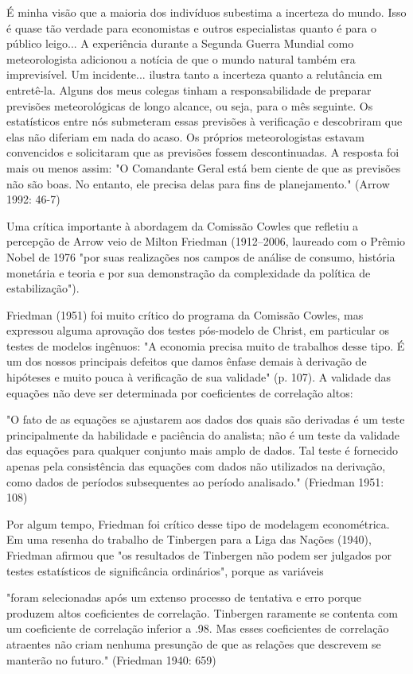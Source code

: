 \documentclass[12pt]{article}
\begin{document}
É minha visão que a maioria dos indivíduos subestima a incerteza do mundo. Isso é quase tão verdade para economistas e outros especialistas quanto é para o público leigo... A experiência durante a Segunda Guerra Mundial como meteorologista adicionou a notícia de que o mundo natural também era imprevisível. Um incidente... ilustra tanto a incerteza quanto a relutância em entretê-la. Alguns dos meus colegas tinham a responsabilidade de preparar previsões meteorológicas de longo alcance, ou seja, para o mês seguinte. Os estatísticos entre nós submeteram essas previsões à verificação e descobriram que elas não diferiam em nada do acaso. Os próprios meteorologistas estavam convencidos e solicitaram que as previsões fossem descontinuadas. A resposta foi mais ou menos assim: "O Comandante Geral está bem ciente de que as previsões não são boas. No entanto, ele precisa delas para fins de planejamento."
(Arrow 1992: 46-7)

Uma crítica importante à abordagem da Comissão Cowles que refletiu a percepção de Arrow veio de Milton Friedman (1912–2006, laureado com o Prêmio Nobel de 1976 "por suas realizações nos campos de análise de consumo, história monetária e teoria e por sua demonstração da complexidade da política de estabilização").

Friedman (1951) foi muito crítico do programa da Comissão Cowles, mas expressou alguma aprovação dos testes pós-modelo de Christ, em particular os testes de modelos ingênuos: "A economia precisa muito de trabalhos desse tipo. É um dos nossos principais defeitos que damos ênfase demais à derivação de hipóteses e muito pouca à verificação de sua validade" (p. 107). A validade das equações não deve ser determinada por coeficientes de correlação altos:

"O fato de as equações se ajustarem aos dados dos quais são derivadas é um teste principalmente da habilidade e paciência do analista; não é um teste da validade das equações para qualquer conjunto mais amplo de dados. Tal teste é fornecido apenas pela consistência das equações com dados não utilizados na derivação, como dados de períodos subsequentes ao período analisado."
(Friedman 1951: 108)

Por algum tempo, Friedman foi crítico desse tipo de modelagem econométrica. Em uma resenha do trabalho de Tinbergen para a Liga das Nações (1940), Friedman afirmou que "os resultados de Tinbergen não podem ser julgados por testes estatísticos de significância ordinários", porque as variáveis

"foram selecionadas após um extenso processo de tentativa e erro porque produzem altos coeficientes de correlação. Tinbergen raramente se contenta com um coeficiente de correlação inferior a .98. Mas esses coeficientes de correlação atraentes não criam nenhuma presunção de que as relações que descrevem se manterão no futuro."
(Friedman 1940: 659)
\end{document}
